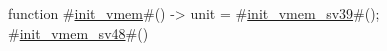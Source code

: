 function #\hyperref[sailRISCVzinitzyvmem]{init\_vmem}#() -> unit = {
  #\hyperref[sailRISCVzinitzyvmemzysv39]{init\_vmem\_sv39}#();
  #\hyperref[sailRISCVzinitzyvmemzysv48]{init\_vmem\_sv48}#()
}
